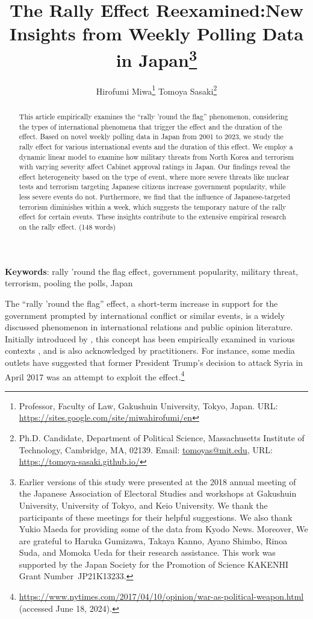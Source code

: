\documentclass[letterpaper,12pt]{scrartcl}
\title{
  \textbf{\textsf{\LARGE The Rally Effect Reexamined:\linebreak New Insights from Weekly Polling Data in Japan}}\if0\blind\thanks{\hspace{3mm}Earlier versions of this study were presented at the 2018 annual meeting of the Japanese Association of Electoral Studies and workshops at Gakushuin University, University of Tokyo, and Keio University. We thank the participants of these meetings for their helpful suggestions. We also thank Yukio Maeda for providing some of the data from Kyodo News. Moreover, We are grateful to Haruka Gumizawa, Takaya Kanno, Ayano Shimbo, Rinoa Suda, and Momoka Ueda for their research assistance. This work was supported by the Japan Society for the Promotion of Science KAKENHI Grant Number~JP21K13233.} \fi
}
\author{
  \if0\blind
  \hspace{1.5in}
  Hirofumi Miwa\thanks{Professor, Faculty of Law, Gakushuin University,
  Tokyo, Japan. URL: \href{https://sites.google.com/site/miwahirofumi/en}{https://sites.google.com/site/miwahirofumi/en}}
  \hspace{.7in}
  Tomoya Sasaki\thanks{Ph.D. Candidate, Department of
  Political Science, Massachusetts Institute of Technology,
  Cambridge, MA, 02139. Email:
  \href{mailto:tomoyas@mit.edu}{tomoyas@mit.edu},
  URL: \href{https://tomoya-sasaki.github.io/}{https://tomoya-sasaki.github.io/}}
  \fi
}
\date{}
\renewcommand{\footnotelayout}{\setstretch{1}}
\begin{document}
\maketitle
\thispagestyle{empty}
\setcounter{page}{0}
\parindent=20pt

\vspace{-5mm}
\begin{abstract}
\noindent
This article empirically examines the ``rally 'round the flag'' phenomenon, considering the types of international phenomena that trigger the effect and the duration of the effect. Based on novel weekly polling data in Japan from 2001 to 2023, we study the rally effect for various international events and the duration of this effect. We employ a dynamic linear model to examine how military threats from North Korea and terrorism with varying severity affect Cabinet approval ratings in Japan. Our findings reveal the effect heterogeneity based on the type of event, where more severe threats like nuclear tests and terrorism targeting Japanese citizens increase government popularity, while less severe events do not. Furthermore, we find that the influence of Japanese-targeted terrorism diminishes within a week, which suggests the temporary nature of the rally effect for certain events. These insights contribute to the extensive empirical research on the rally effect. (148 words)
\end{abstract}

\bigskip
\bigskip
\noindent \textbf{Keywords}: rally 'round the flag effect, government popularity, military threat, terrorism, pooling the polls, Japan

\newpage
\doublespacing

\noindent
The ``rally 'round the flag'' effect, a short-term increase in support for the government prompted by international conflict or similar events, is a widely discussed phenomenon in international relations and public opinion literature. Initially introduced by \citet{Mueller1970APSR}, this concept has been empirically examined in various contexts \citep[e.g.,][]{Oneal1995PolitBehav,Baker2001JCR,Chapman2004JCR,Lai2005ISQ,seo2023}, and is also acknowledged by practitioners. For instance, some media outlets have suggested that former President Trump's decision to attack Syria in April 2017 was an attempt to exploit the effect.\footnote{\url{https://www.nytimes.com/2017/04/10/opinion/war-as-political-weapon.html} (accessed June 18, 2024).}
\end{document}
